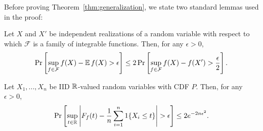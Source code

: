 \documentclass{article}
\begin{document}
Before proving Theorem~\ref{thm:generalization}, we state two standard lemmas used in the proof:
\begin{lemma}
    Let $X$ and $X'$ be independent realizations of a random variable with respect to which $\mathcal{F}$ is a family of integrable functions. Then, for any $\epsilon > 0$,
    \[\Pr \left[ \sup_{f \in \mathcal{F}} f(X) - \operatorname{\mathbb{E}} f(X) > \epsilon \right]
        \leq 2\Pr \left[ \sup_{f \in \mathcal{F}} f(X) - f(X') > \frac{\epsilon}{2} \right].\]
    \label{lemma:symmetrization}
\end{lemma}

\begin{lemma}
    Let $X_1,...,X_n$ be IID $\mathbb{R}$-valued random variables with CDF $P$. Then, for any $\epsilon > 0$,
    \[\Pr \left[ \sup_{t \in \mathbb{R}} \left| F_f(t) - \frac{1}{n} \sum_{i = 1}^n 1\{X_i \leq t\} \right| > \epsilon \right] \leq 2e^{-2n\epsilon^2}.\]
    \label{lemma:DKW}
\end{lemma}
\end{document}
